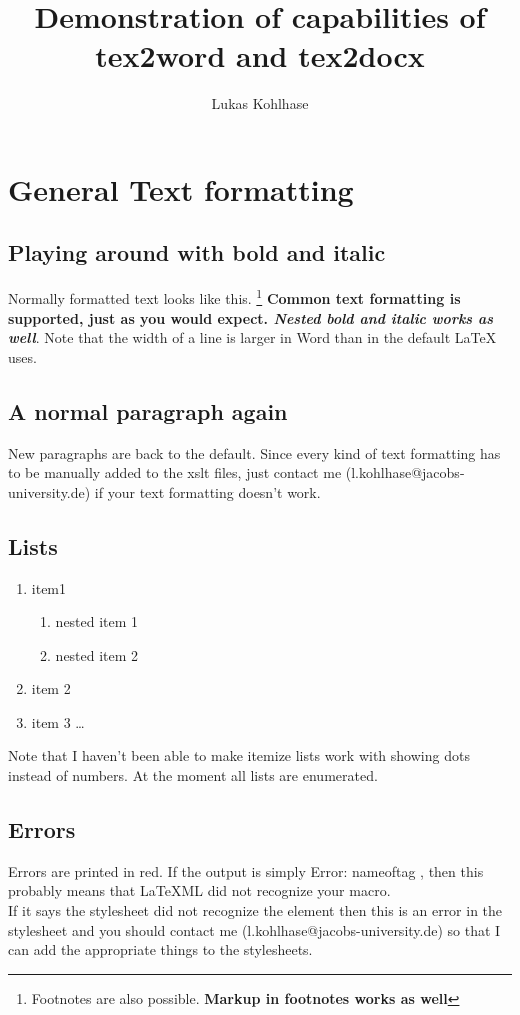 \documentclass{article}
\author{Lukas Kohlhase}
\title{Demonstration of capabilities of tex2word and tex2docx}
\begin{document}
\maketitle
\tableofcontents
\section{General Text formatting}
\subsection{Playing around with bold and italic}
Normally formatted text looks like this. \footnote{Footnotes are also possible. \textbf{Markup in footnotes works as well}} \textbf{Common text formatting is supported, just as you would expect. \textit {Nested bold and italic works as well}}. Note that the width of a line is larger in Word than in the default LaTeX uses.  \\ 
\subsection{A normal paragraph again}
New paragraphs are back to the default. Since every kind of text formatting has to be manually added to the xslt files, just contact me (l.kohlhase@jacobs-university.de) if your text formatting doesn't work. 
\subsection{Lists}
\begin{enumerate}
\item item1
\begin{enumerate}
\item nested item 1
\item nested item 2
\end{enumerate}
\item item 2 
\item item 3 \ldots 
\end{enumerate}
Note that I haven't been able to make itemize lists work with showing dots instead of numbers. At the moment all lists are enumerated.
\subsection{Errors}
\nonsensicaltag 
Errors are printed in red. If the output is simply Error: nameoftag , then this probably means that LaTeXML did not recognize your macro. \\ 
If it says the stylesheet did not recognize the element then this is an error in the stylesheet and you should contact me (l.kohlhase@jacobs-university.de) so that I can add the appropriate things to the stylesheets. 
\end{document}
